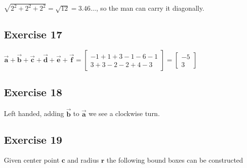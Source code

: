 \documentclass[11pt]{article}
\begin{document}
$\sqrt{2^2+2^2+2^2}=\sqrt{12}=3.46\dots{}$, so the man can carry it diagonally.

\subsection{Exercise 17}

$\vec{\textbf{a}}+\vec{\textbf{b}}+\vec{\textbf{c}}+\vec{\textbf{d}}+\vec{\textbf{e}}+\vec{\textbf{f}}=
\begin{bmatrix}
-1 + 1 + 3 -1 - 6 - 1 \\
3 + 3 - 2 - 2 + 4 - 3
\end{bmatrix}=
\begin{bmatrix}
-5 \\
3
\end{bmatrix}$

\subsection{Exercise 18}

Left handed, adding $\vec{\textbf{b}}$ to $\vec{\textbf{a}}$ we see a clockwise turn.

\subsection{Exercise 19}

Given center point $\textbf{c}$ and radius $\textbf{r}$ the following bound boxes can be constructed
\end{document}
